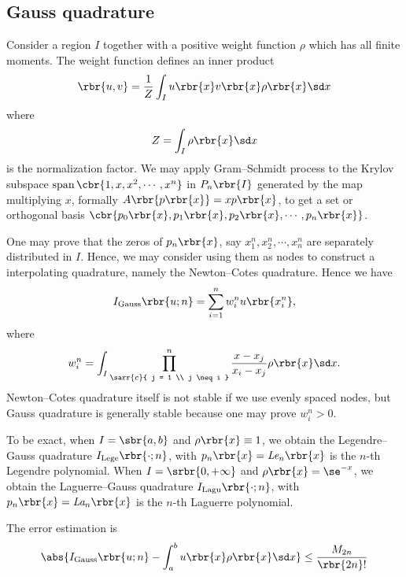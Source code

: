 \documentclass[english, nochinese]{pnote}
\DeclareMathOperator{\opspan}{\mathrm{span}}
\begin{document}
\subsection{Gauss quadrature}

Consider a region $I$ together with a positive weight function $\rho$ which has all finite moments. The weight function defines an inner product
\begin{equation}
\rbr{ u, v } = \frac{1}{Z} \int_I u \rbr{x} v \rbr{x} \rho \rbr{x} \sd x
\end{equation}
where
\begin{equation}
Z = \int_I \rho \rbr{x} \sd x
\end{equation}
is the normalization factor. We may apply Gram--Schmidt process to the Krylov subspace $ \opspan \cbr{ 1, x, x^2, \cdots, x^n } $ in $ P_n \rbr{I} $ generated by the map multiplying $x$, formally $ A \rbr{ p \rbr{x} } = x p \rbr{x} $, to get a set or orthogonal basis $ \cbr{ p_0 \rbr{x}, p_1 \rbr{x}, p_2 \rbr{x}, \cdots, p_n \rbr{x} } $.

One may prove that the zeros of $ p_n \rbr{x} $, say $ x_1^n, x_2^n, \cdots, x_n^n $ are separately distributed in $I$. Hence, we may consider using them as nodes to construct a interpolating quadrature, namely the Newton--Cotes quadrature. Hence we have
\begin{equation}
I_{\text{Gauss}} \rbr{ u; n } = \sum_{ i = 1 }^n w_i^n u \rbr{x_i^n},
\end{equation}
where
\begin{equation}
w_i^n = \int_I \prod_{\sarr{c}{ j = 1 \\ j \neq i }}^n \frac{ x - x_j }{ x_i - x_j } \rho \rbr{x} \sd x.
\end{equation}
Newton--Cotes quadrature itself is not stable if we use evenly spaced nodes, but Gauss quadrature is generally stable because one may prove $ w_i^n > 0 $.

To be exact, when $ I = \sbr{ a, b } $ and $ \rho \rbr{x} \equiv 1 $, we obtain the Legendre--Gauss quadrature $ I_{\text{Lege}} \rbr{ \cdot; n } $, with $ p_n \rbr{x} = \textit{Le}_n \rbr{x} $ is the $n$-th Legendre polynomial. When $ I = \srbr{ 0, +\infty } $ and $ \rho \rbr{x} = \se^{-x} $, we obtain the Laguerre--Gauss quadrature $ I_{\text{Lagu}} \rbr{ \cdot; n } $, with $ p_n \rbr{x} = \textit{La}_n \rbr{x} $ is the $n$-th Laguerre polynomial.

The error estimation is
\begin{equation} \label{Eq:GaussEst}
\abs{ I_{\text{Gauss}} \rbr{ u; n } - \int_a^b u \rbr{x} \rho \rbr{x} \sd x } \le \frac{M_{ 2 n }}{ \rbr{ 2 n } ! }
\end{equation}
\end{document}
